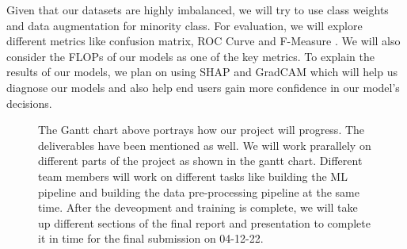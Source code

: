 \documentclass[10pt,twocolumn,letterpaper]{article}
\begin{document}
Given that our datasets are highly imbalanced, we will try to use class weights and 
data augmentation for minority class\cite{smote}.   
For evaluation, we will explore different metrics like confusion matrix, 
ROC Curve and F-Measure \cite{fmeasure}. 
We will also consider the FLOPs of our models 
as one of the key metrics. To explain the results of our models, 
we plan on using SHAP \cite{NIPS2017_8a20a862} and GradCAM \cite{jacobgilpytorchcam} which will help us diagnose our 
models and also help end users gain more confidence in our model's decisions.
\clearpage
\begin{figure}
  \vspace{14cm}
  \hspace{0.75cm}
\caption{The Gantt chart above portrays how our project will progress. 
The deliverables have been mentioned as well. We will work 
prarallely on different parts of the project as shown in the gantt chart. 
Different team members will work on different tasks like building 
the ML pipeline and building the data pre-processing pipeline at the same time. 
After the deveopment and training is complete, we will take up 
different sections of the final report and presentation to complete 
it in time for the final submission on 04-12-22.}
\end{figure}

\clearpage
{\small


}
\end{document}
